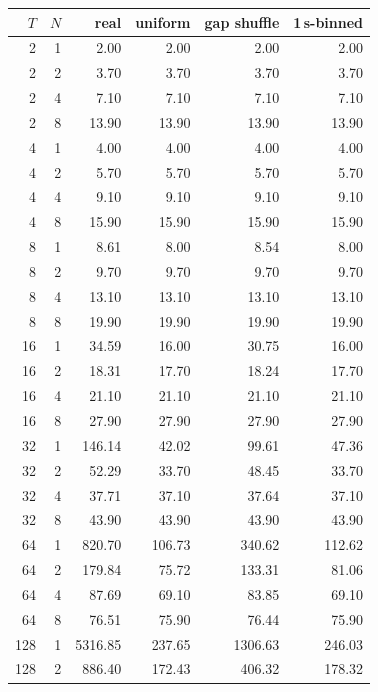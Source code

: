 \documentclass[11pt]{article}
\begin{document}
\begin{table}[tbp]
\centering
\small
\begin{tabular}{@{}rr rrrr@{}}
\toprule
$T$ & $N$ & real & uniform & gap shuffle & 1\,s-binned \\
\midrule
 2 & 1 &    2.00 &    2.00 &    2.00 &    2.00 \\
 2 & 2 &    3.70 &    3.70 &    3.70 &    3.70 \\
 2 & 4 &    7.10 &    7.10 &    7.10 &    7.10 \\
 2 & 8 &   13.90 &   13.90 &   13.90 &   13.90 \\
\midrule
 4 & 1 &    4.00 &    4.00 &    4.00 &    4.00 \\
 4 & 2 &    5.70 &    5.70 &    5.70 &    5.70 \\
 4 & 4 &    9.10 &    9.10 &    9.10 &    9.10 \\
 4 & 8 &   15.90 &   15.90 &   15.90 &   15.90 \\
\midrule
 8 & 1 &    8.61 &    8.00 &    8.54 &    8.00 \\
 8 & 2 &    9.70 &    9.70 &    9.70 &    9.70 \\
 8 & 4 &   13.10 &   13.10 &   13.10 &   13.10 \\
 8 & 8 &   19.90 &   19.90 &   19.90 &   19.90 \\
\midrule
16 & 1 &   34.59 &   16.00 &   30.75 &   16.00 \\
16 & 2 &   18.31 &   17.70 &   18.24 &   17.70 \\
16 & 4 &   21.10 &   21.10 &   21.10 &   21.10 \\
16 & 8 &   27.90 &   27.90 &   27.90 &   27.90 \\
\midrule
32 & 1 &  146.14 &   42.02 &   99.61 &   47.36 \\
32 & 2 &   52.29 &   33.70 &   48.45 &   33.70 \\
32 & 4 &   37.71 &   37.10 &   37.64 &   37.10 \\
32 & 8 &   43.90 &   43.90 &   43.90 &   43.90 \\
\midrule
64 & 1 &  820.70 &  106.73 &  340.62 &  112.62 \\
64 & 2 &  179.84 &   75.72 &  133.31 &   81.06 \\
64 & 4 &   87.69 &   69.10 &   83.85 &   69.10 \\
64 & 8 &   76.51 &   75.90 &   76.44 &   75.90 \\
\midrule
128 & 1 & 5316.85 &  237.65 & 1306.63 &  246.03 \\
128 & 2 &  886.40 &  172.43 &  406.32 &  178.32 \\

\end{tabular}
\end{table}
\end{document}
